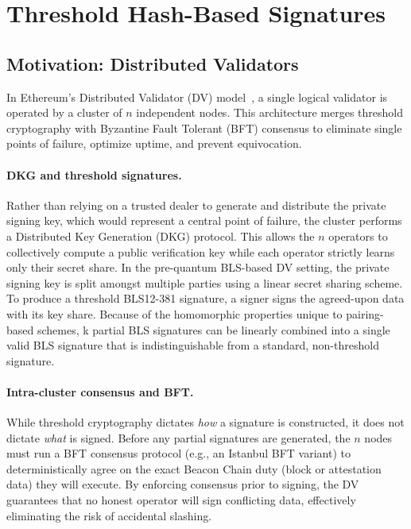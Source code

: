 \documentclass[11pt,a4paper]{article}
\newcommand{\bls}{\textsf{BLS12-381}\xspace}
\begin{document}
\section{Threshold Hash-Based Signatures}
\label{sec:threshold}

\subsection{Motivation: Distributed Validators}

In Ethereum's Distributed Validator (DV) model~\cite{DVT}, a single logical validator is operated by a cluster of $n$ independent nodes.
This architecture merges threshold cryptography with Byzantine Fault Tolerant (BFT) consensus to eliminate single points of failure, optimize uptime, and prevent equivocation.

\paragraph{DKG and threshold signatures.}
Rather than relying on a trusted dealer to generate and distribute the private signing key, which would represent a central point of failure, the cluster performs a Distributed Key Generation (DKG) protocol.
This allows the $n$ operators to collectively compute a public verification key while each operator strictly learns only their secret share.
In the pre-quantum BLS-based DV setting, the private signing key is split amongst multiple parties using a linear secret sharing scheme.
To produce a threshold \bls signature, a signer signs the agreed-upon data with its key share.
Because of the homomorphic properties unique to pairing-based schemes, k partial BLS signatures can be linearly combined into a single valid BLS signature that is indistinguishable from a standard, non-threshold signature.

\paragraph{Intra-cluster consensus and BFT.}
While threshold cryptography dictates \textit{how} a signature is constructed, it does not dictate \textit{what} is signed.
Before any partial signatures are generated, the $n$ nodes must run a BFT consensus protocol (e.g., an Istanbul BFT variant) to deterministically agree on the exact Beacon Chain duty (block or attestation data) they will execute.
By enforcing consensus prior to signing, the DV guarantees that no honest operator will sign conflicting data, effectively eliminating the risk of accidental slashing.
\end{document}
